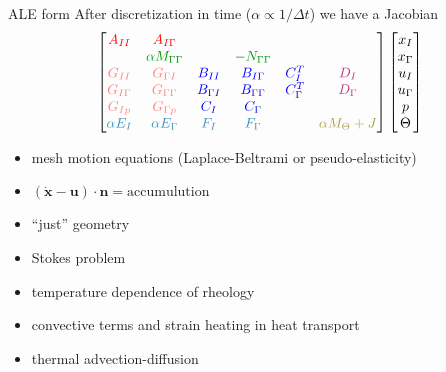 \newcommand{\colorA}[1]{{\color{red} #1}}
\newcommand{\colorB}[1]{{\color{green!60!black} #1}}
\newcommand{\colorC}[1]{{\color{blue} #1}}
\newcommand{\colorD}[1]{{\color{magenta!70!black} #1}}
\newcommand{\colorE}[1]{{\color{cyan!70!black} #1}}
\newcommand{\colorF}[1]{{\color{yellow!60!black} #1}}
\newcommand{\colorG}[1]{{\color{red!50!white} #1}}

\begin{frame}{ALE form}
  After discretization in time ($\alpha \propto 1/\Delta t$) we have a Jacobian
  \begin{equation*}
    \begin{bmatrix}
      \colorA{A_{II}} & \colorA{A_{I\Gamma}}             &                       &                             &                     &   \\
      & \colorB{\alpha M_{\Gamma\Gamma}} &                       & \colorB{- N_{\Gamma\Gamma}} &                       &  \\
      \colorG{G_{II}}      & \colorG{G_{\Gamma I}} & \colorC{B_{II}}       & \colorC{B_{I\Gamma}}        & \colorC{C_{I}^T}    & \colorD{D_I} \\
      \colorG{G_{I\Gamma}} &        \colorG{G_{\Gamma\Gamma}}                          & \colorC{B_{\Gamma I}} & \colorC{B_{\Gamma\Gamma}}   & \colorC{C_{\Gamma}^T} & \colorD{D_\Gamma} \\
      \colorG{G_{Ip}}        &  \colorG{G_{\Gamma p}}                                & \colorC{C_{I}}        & \colorC{C_{\Gamma}}         &                   & \\
      \colorE{\alpha E_I}    & \colorE{\alpha E_\Gamma} & \colorE{F_I} & \colorE{F_\Gamma} & & \colorF{\alpha M_\Theta + J}
    \end{bmatrix}
    \begin{bmatrix}
      x_I \\ x_\Gamma \\ u_I \\ u_\Gamma \\ p \\ \Theta
    \end{bmatrix}
  \end{equation*}
  \begin{itemize}
  \item \colorA{mesh motion equations (Laplace-Beltrami or pseudo-elasticity)}
  \item \colorB{$(\dot{\bm x} - \bm u)\cdot \bm n = \text{accumulution}$}
  \item \colorG{``just'' geometry}
  \item \colorC{Stokes problem}
  \item \colorD{temperature dependence of rheology}
  \item \colorE{convective terms and strain heating in heat transport}
  \item \colorF{thermal advection-diffusion}
  \end{itemize}
\end{frame}
